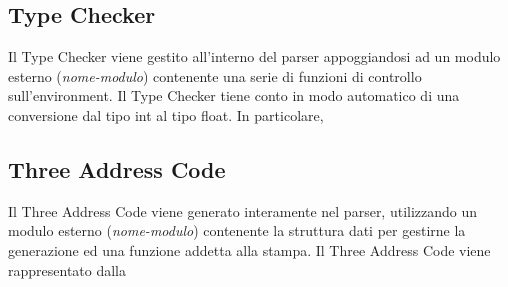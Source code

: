 \documentclass[12pt]{article}
\begin{document}
\subsection*{Type Checker}
Il Type Checker viene gestito all'interno del parser appoggiandosi ad un modulo esterno (\textit{nome-modulo}) contenente una serie di funzioni di controllo sull'environment. Il Type Checker tiene conto in modo automatico di una conversione dal tipo int al tipo float.
In particolare, 

\subsection*{Three Address Code}
Il Three Address Code viene generato interamente nel parser, utilizzando un modulo esterno (\textit{nome-modulo}) contenente la struttura dati per gestirne la generazione ed una funzione addetta alla stampa.
Il Three Address Code viene rappresentato dalla 
\end{document}
